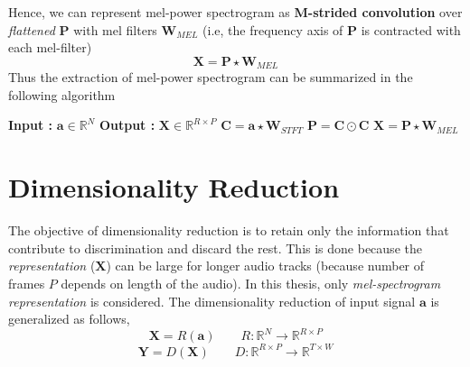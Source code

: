 \noindent Hence, we can represent mel-power spectrogram as \textbf{M-strided convolution} over \textit{flattened} $\textbf{P}$ with mel filters $\textbf{W}_{MEL}$ (i.e, the frequency axis of $\textbf{P}$ is contracted with each mel-filter) 
\begin{equation}
\label{eq:mel}
\boxed
{
  \textbf{X} = \textbf{P} \star \textbf{W}_{MEL}
}
\end{equation}  
Thus the extraction of mel-power spectrogram can be summarized in the following algorithm 
\begin{algorithm}
  \caption{$\textbf{X}$ = $R_{(MEL)}$($\textbf{a}$)}\label{alg:mel}
  \begin{algorithmic}[1]
    \Statex \textbf{Input :} $\textbf{a} \in \mathbb{R}^{N}$
    \Statex \textbf{Output :} $\textbf{X} \in \mathbb{R}^{R \times P}$
	\State $\textbf{C} = \textbf{a} \star \textbf{W}_{STFT}$
	\State $\textbf{P} = \textbf{C} \odot \textbf{C}$
	\State $\textbf{X} = \textbf{P} \star \textbf{W}_{MEL}$
  \end{algorithmic}
\end{algorithm}
\FloatBarrier

\section{Dimensionality Reduction}
\label{dimension}
The objective of dimensionality reduction is to retain only the information that contribute to discrimination and discard the rest. This is done because the \textit{representation} ($\textbf{X}$) can be large for longer audio tracks (because number of frames $P$ depends on length of the audio). In this thesis, only \textit{mel-spectrogram representation} is considered. The dimensionality reduction of input signal $\textbf{a}$ is generalized as follows,
\[
   \textbf{X} = R(\textbf{a}) \qquad R : \mathbb{R}^{N} \rightarrow \mathbb{R}^{R \times P}
\]
\begin{equation}
\label{dim_red_abstract}
   \textbf{Y} = D(\textbf{X}) \qquad D : \mathbb{R}^{R \times P} \rightarrow \mathbb{R}^{T \times W} 
\end{equation}
 
